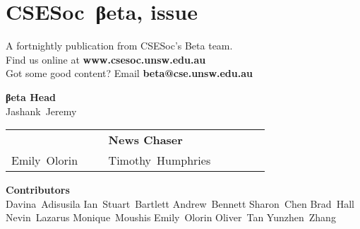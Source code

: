 \documentclass[twoside]{article}
\date{5 September 2015}
\makeatletter
\gdef\the@issue{111}
\makeatother
\begin{document}

\newpage
\maketitle\thispagestyle{mag}
\vspace*{-2em}\section*{CSE{}Soc~βeta, issue \makeatletter\the@issue}
\begin{multicols}{2}\begingroup\raggedcolumns
\begin{center}
A fortnightly publication from CSESoc's Beta team.\\
Find us online at \textbf{www.csesoc.unsw.edu.au}\\
Got some good content? Email \textbf{beta@cse.unsw.edu.au}\\
\par{\bf\sffamily βeta Head}\\ Jashank~Jeremy
\par\begin{tabular}{>{\raggedleft}p{0.3\linewidth}>{\raggedright}p{0.5\linewidth}}
{\bf\sffamily Puzzle Wrangler} & {\bf\sffamily News Chaser}\tabularnewline
Emily~Olorin & Timothy~Humphries\tabularnewline
\end{tabular}
\par{\bf\sffamily Contributors}\\
  Davina~Adisusila\hsp{}
  Ian~Stuart~Bartlett\hsp{}
  Andrew~Bennett\hsp{}
  Sharon~Chen\hsp{}
  Brad~Hall\hsp{}
  Nevin~Lazarus\hsp{}
  Monique~Moushis\hsp{}
  Emily~Olorin\hsp{}
  Oliver~Tan\hsp{}
  Yunzhen~Zhang\hsp{}
\end{center}
\columnbreak\malcontents\vfill\endgroup
\end{multicols}\LRmulticolcolumns
\vspace*{-4em}\begin{multicols}{2}


\end{multicols}
\end{document}
